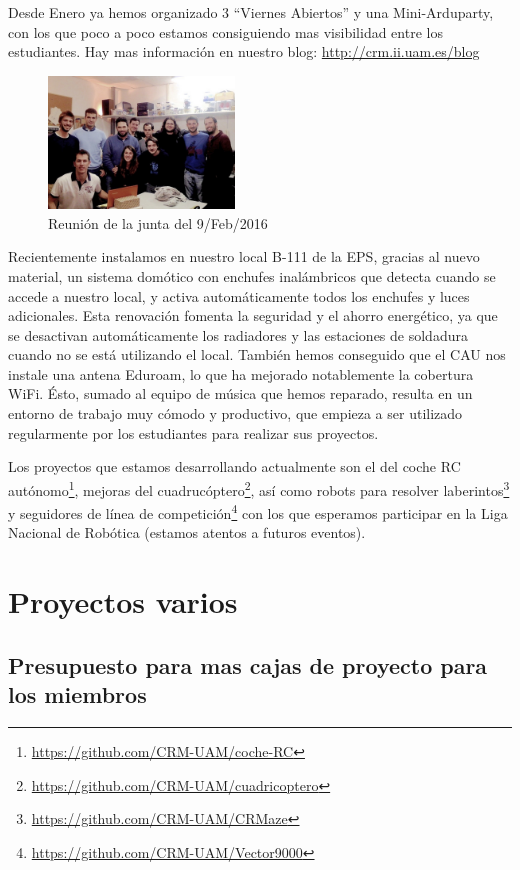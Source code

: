 \documentclass[12pt,twoside]{report}
\begin{document}
Desde Enero ya hemos organizado 3 ``Viernes Abiertos'' y una Mini-Arduparty, con los que poco a poco estamos consiguiendo mas visibilidad entre los estudiantes. Hay mas información en nuestro blog: \url{http://crm.ii.uam.es/blog}

\begin{figure}
\centering
\includegraphics[width=0.44\textwidth]{fotosNuevas/acta9feb2016_b}
\caption*{Reunión de la junta del 9/Feb/2016}
\end{figure}

Recientemente instalamos en nuestro local B-111 de la EPS, gracias al nuevo material, un sistema domótico con enchufes inalámbricos que detecta cuando se accede a nuestro local, y activa automáticamente todos los enchufes y luces adicionales. Esta renovación fomenta la seguridad y el ahorro energético, ya que se desactivan automáticamente los radiadores y las estaciones de soldadura cuando no se está utilizando el local.
También hemos conseguido que el CAU nos instale una antena Eduroam, lo que ha mejorado notablemente la cobertura WiFi. Ésto, sumado al equipo de música que hemos reparado, resulta en un entorno de trabajo muy cómodo y productivo, que empieza a ser utilizado regularmente por los estudiantes para realizar sus proyectos.

Los proyectos que estamos desarrollando actualmente son el del coche RC autónomo\footnote{\url{https://github.com/CRM-UAM/coche-RC}}, 
mejoras del cuadrucóptero\footnote{\url{https://github.com/CRM-UAM/cuadricoptero}}, así como robots para resolver laberintos\footnote{\url{https://github.com/CRM-UAM/CRMaze}} y seguidores de línea de competición\footnote{\url{https://github.com/CRM-UAM/Vector9000}} con los que esperamos participar en la Liga Nacional de Robótica (estamos atentos a futuros eventos).


\section{Proyectos varios}

\subsection{Presupuesto para mas cajas de proyecto para los miembros}
\end{document}
